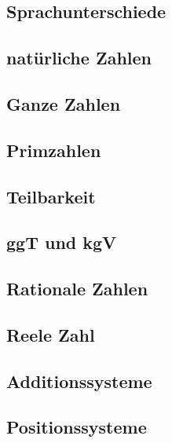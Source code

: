 \subsection{Sprachunterschiede}\label{subsec:zahlen_sprachunterschiede}


\subsection{natürliche Zahlen}\label{subsec:zahlen_naturliche-zahlen}


\subsection{Ganze Zahlen}\label{subsec:zahlen_ganze-zahlen}


\subsection{Primzahlen}\label{subsec:zahlen_primzahlen}


\subsection{Teilbarkeit}\label{subsec:zahlen_teilbarkeit}


\subsection{ggT und kgV}\label{subsec:zahlen_ggt-und-kgv}


\subsection{Rationale Zahlen}\label{subsec:zahlen_rationale-zahlen}


\subsection{Reele Zahl}\label{subsec:zahlen_reelle-zahl}


\subsection{Additionssysteme}\label{subsec:zahlen_additionssysteme}


\subsection{Positionssysteme}\label{subsec:zahlen_positionssysteme}


